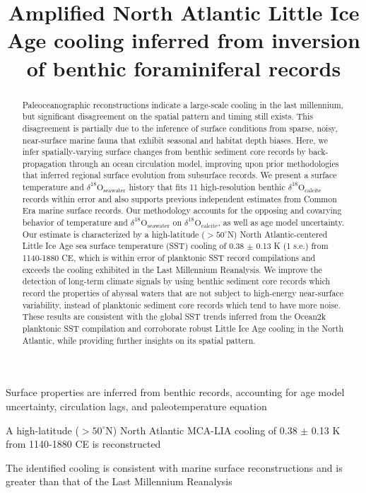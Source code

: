 \documentclass[draft]{agujournal2019}
\begin{document}
\title{Amplified North Atlantic Little Ice Age cooling inferred from inversion of benthic foraminiferal records}



\begin{keypoints}
\item Surface properties are inferred from benthic records, accounting for age model uncertainty, circulation lags, and paleotemperature equation
\item A high-latitude ($>50^{\circ}$N) North Atlantic MCA-LIA cooling of 0.38 $\pm$ 0.13 K from 1140-1880 CE is reconstructed 
\item The identified cooling is consistent with marine surface reconstructions and is greater than that of the Last Millennium Reanalysis
\end{keypoints}
\begin{abstract}
  Paleoceanographic reconstructions indicate a large-scale cooling in
  the last millennium, but significant disagreement on the spatial
  pattern and timing still exists. This disagreement is partially due
  to the inference of surface conditions from sparse, noisy,
  near-surface marine fauna that exhibit seasonal and habitat
  depth biases. Here, we infer spatially-varying surface changes from
  benthic sediment core records by back-propagation through an ocean
  circulation model, improving upon prior methodologies that inferred
  regional surface evolution from subsurface records. We present a
  surface temperature and $\delta^{18}\mathrm{O}_{\mathrm{seawater}}$
  history that fits 11 high-resolution benthic
  $\delta^{18}\mathrm{O}_{\mathrm{calcite}}$ records within error and also
  supports previous independent estimates from Common Era marine
  surface records. Our methodology accounts for the opposing and
  covarying behavior of temperature and
  $\delta^{18}\mathrm{O}_{\mathrm{seawater}}$ on
  $\delta^{18}\mathrm{O}_{\mathrm{calcite}}$, as well as age model uncertainty.
  Our estimate is
  characterized by a high-latitude ($>50^{\circ}$N) North Atlantic-centered
  Little Ice Age sea
  surface temperature (SST) cooling of
  0.38 $\pm$ 0.13 K (1 s.e.) from
  1140-1880 CE, which is within error of planktonic SST record compilations
  and exceeds the cooling exhibited in the Last Millennium Reanalysis.
  We improve the detection of long-term climate signals by using
  benthic sediment core records which record the properties of
  abyssal waters that are not subject to high-energy near-surface
  variability, instead of planktonic sediment core records which tend
  to have more noise. These results are consistent with the global
  SST trends inferred from the Ocean2k planktonic SST compilation and
  corroborate robust Little Ice Age cooling in the North Atlantic, while providing further insights on its spatial pattern.
\end{abstract}
\end{document}
